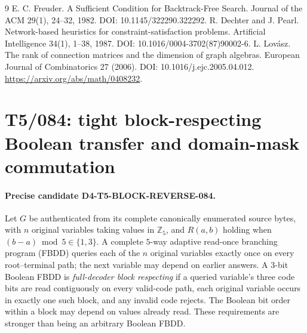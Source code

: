 \documentclass[11pt]{article}
\begin{document}
\begin{thebibliography}{9}
 E. C. Freuder. A Sufficient Condition for Backtrack-Free Search. Journal of the ACM 29(1), 24--32, 1982. DOI: 10.1145/322290.322292.
 R. Dechter and J. Pearl. Network-based heuristics for constraint-satisfaction problems. Artificial Intelligence 34(1), 1--38, 1987. DOI: 10.1016/0004-3702(87)90002-6.
 L. Lov\'asz.
The rank of connection matrices and the dimension of graph algebras.
European Journal of Combinatorics 27 (2006).
DOI: 10.1016/j.ejc.2005.04.012.
\url{https://arxiv.org/abs/math/0408232}.

\end{thebibliography}

\section{T5/084: tight block-respecting Boolean transfer and domain-mask commutation}
\label{sec:t5block084}

\paragraph{Precise candidate D4-T5-BLOCK-REVERSE-084.}
Let $G$ be authenticated from its complete canonically enumerated
source bytes, with $n$ original variables taking values in
$\mathbb Z_5$, and $R(a,b)$ holding when
$(b-a)\bmod5\in\{1,3\}$. A complete $5$-way adaptive read-once
branching program (FBDD) queries each of the $n$ original
variables exactly once on every root--terminal path; the next
variable may depend on earlier answers. A $3$-bit Boolean FBDD
is \emph{full-decoder block respecting} if a queried variable's
three code bits are read contiguously on every valid-code path,
each original variable occurs in exactly one such block,
and any invalid code rejects. The Boolean bit order within a
block may depend on values already read. These requirements
are stronger than being an arbitrary Boolean FBDD.
\end{document}
